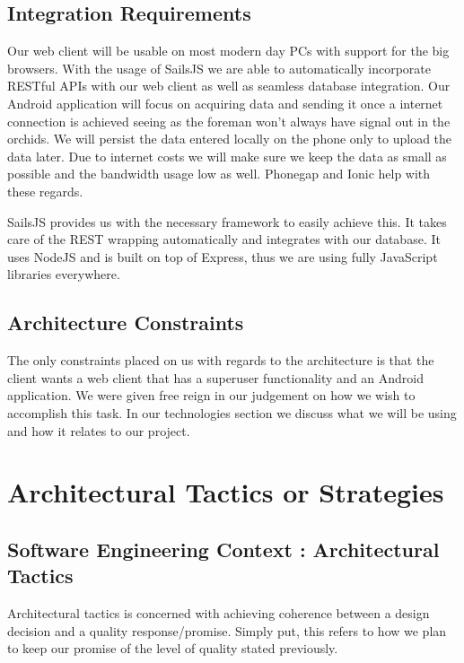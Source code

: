 \documentclass[11pt,fleqn]{book} %
\begin{document}
	\section{Integration Requirements}
		Our web client will be usable on most modern day PCs with support for the big browsers. With the usage of SailsJS we are able to automatically incorporate RESTful APIs with our web client as well as seamless database integration.\newline
		Our Android application will focus on acquiring data and sending it once a internet connection is achieved seeing as the foreman won’t always have signal out in the orchids. We will persist the data entered locally on the phone only to upload the data later. Due to internet costs we will make sure we keep the data as small as possible and the bandwidth usage low as well. Phonegap and Ionic help with these regards.\newline

		SailsJS provides us with the necessary framework to easily achieve this. It takes care of the REST wrapping automatically and integrates with our database. It uses NodeJS and is built on top of Express, thus we are using fully JavaScript libraries everywhere.\newline
	\section{Architecture Constraints}
		The only constraints placed on us with regards to the architecture is that the client wants a web client that has a superuser functionality and an Android application. We were given free reign in our judgement on how we wish to accomplish this task. In our technologies section we discuss what we will be using and how it relates to our project.\newline
	
	
	
	\chapter{Architectural Tactics or Strategies}
	
	\section{Software Engineering Context : Architectural Tactics}
		Architectural tactics is concerned with achieving coherence between a design decision and a quality response/promise. Simply put, this refers to how we plan to keep our promise of the level of quality stated previously.\newline
\end{document}

